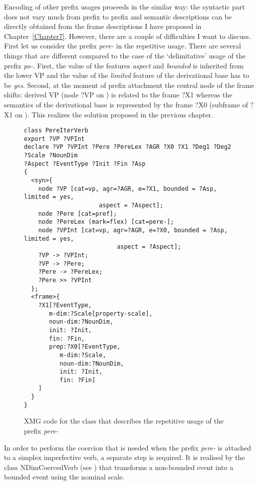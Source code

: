 Encoding of other prefix usages proceeds in the similar way: the syntactic part does not vary much from prefix to prefix and semantic descriptions can be directly obtained from the frame descriptions I have proposed in Chapter~\ref{Chapter7}. However, there are a couple of difficulties I want to discuss. First let us consider the prefix \textit{pere-} in the repetitive usage. There are several things that are different compared to the case of the `delimitative' usage of the prefix \textit{po-}. First, the value of the features \textit{aspect} and \textit{bounded} is inherited from the  lower VP and the value of the \textit{limited} feature of the derivational base has to be \textit{yes}. Second, at the moment of prefix attachment the central node of the frame shifts: derived VP (node ?VP on ) is related to the frame ?X1 whereas the semantics of the derivational base is represented by the frame ?X0 (subframe of ?X1 on ). This realizes the solution proposed in the previous chapter. 

\begin{figure}
\begin{verbatim}
class PereIterVerb
export ?VP ?VPInt 
declare ?VP ?VPInt ?Pere ?PereLex ?AGR ?X0 ?X1 ?Deg1 ?Deg2 ?Scale ?NounDim
?Aspect ?EventType ?Init ?Fin ?Asp
{
  <syn>{
    node ?VP [cat=vp, agr=?AGR, e=?X1, bounded = ?Asp, limited = yes, 
    				 aspect = ?Aspect];
    node ?Pere [cat=pref];
    node ?PereLex (mark=flex) [cat=pere-];
    node ?VPInt [cat=vp, agr=?AGR, e=?X0, bounded = ?Asp, limited = yes, 
    					  aspect = ?Aspect];
    ?VP -> ?VPInt;
    ?VP -> ?Pere;
    ?Pere -> ?PereLex;
    ?Pere >> ?VPInt
  };
  <frame>{
    ?X1[?EventType,
       m-dim:?Scale[property-scale],
       noun-dim:?NounDim,
       init: ?Init,
       fin: ?Fin,
       prep:?X0[?EventType,
          m-dim:?Scale,
          noun-dim:?NounDim,
          init: ?Init,
          fin: ?Fin]
    ]
  }
}
\end{verbatim}
\caption{XMG code for the class that describes the repetitive usage of the prefix \textit{pere-}\label{code:pere}}
\end{figure}

In order to perform the coercion that is needed when the prefix \textit{pere-} is attached to a simplex imperfective verb, a separate step is required. It is realised by the class NDimCoercedVerb (see ) that transforms a non-bounded event into a bounded event using the nominal scale.

